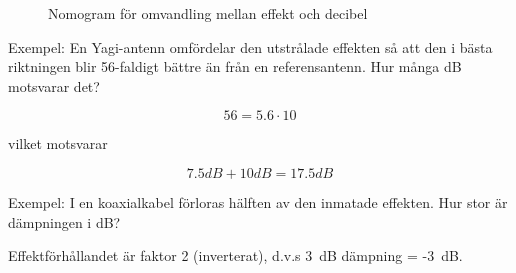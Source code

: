 \begin{rev-raderas}
\begin{figure}
  \caption{Nomogram för omvandling mellan effekt och decibel}
  \label{appendix-c-nomogram-db-effekt}
\end{figure}

Exempel: En Yagi-antenn omfördelar den utstrålade effekten så att den
i bästa riktningen blir 56-faldigt bättre än från en
referensantenn. Hur många dB motsvarar det?

\[ 56 = 5.6 \cdot 10\]

vilket motsvarar

\[ 7.5 dB + 10 dB = 17.5 dB\]

Exempel: I en koaxialkabel förloras hälften av den inmatade
effekten. Hur stor är dämpningen i dB?

Effektförhållandet är faktor 2 (inverterat), d.v.s 3~dB dämpning =
-3~dB.

\end{rev-raderas}

